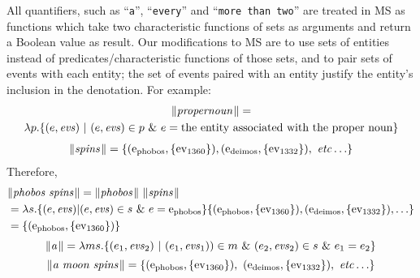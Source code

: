 \documentclass[../main.tex]{subfiles}
\begin{document}
\begin{refsection}
All quantifiers, such as ``\texttt{a}'', ``\texttt{every}'' and ``\texttt{more than two}'' are treated in MS as functions which take two characteristic functions of sets as arguments and return a Boolean value as result. Our modifications to MS are to use sets of entities instead of predicates/characteristic functions of those sets, and to pair sets of events with each entity; the set of events paired with an entity justify the entity’s inclusion in the denotation. For example:
\begin{multline*}
	\lVert\textit{propernoun\hspace{0.1em}}\rVert = \\ \lambda p.
	\{(e, \operatorname{\mathit{evs}})\ |\ (e, \operatorname{\mathit{evs}}) \in p\ \&\ e = \text{the entity associated with the proper noun}\}
\end{multline*}
\begin{equation*}
	\begin{split}
		\lVert\textit{spins\hspace{0.1em}}\rVert = \{(\mathrm{e}_{\operatorname{phobos}}, \{\operatorname{ev}_{1360}\}),
		(\mathrm{e}_{\operatorname{deimos}}, \{\operatorname{ev}_{1332}\}),\ \operatorname{\mathit{etc\ldots}}\}
	\end{split}
\end{equation*}
Therefore,
\begin{equation*}
	\begin{split}
		& \lVert\textit{phobos spins\hspace{0.1em}}\rVert = \lVert\textit{phobos\hspace{0.1em}}\rVert\ \lVert\textit{spins\hspace{0.1em}}\rVert \\
		& = \lambda s.\{(e, \operatorname{\mathit{evs}}) | (e, \operatorname{\mathit{evs}}) \in s\ \&\ e = \mathrm{e}_{\operatorname{phobos}}\}
		 \{(\mathrm{e}_{\operatorname{phobos}},\{\operatorname{ev}_{1360}\}), (\mathrm{e}_{\operatorname{deimos}}, \{\operatorname{ev}_{1332}\}), \ldots\} \\
		& = \{(\mathrm{e}_{\operatorname{phobos}}, \{\operatorname{ev}_{1360}\})\}
	\end{split}
\end{equation*}
\begin{equation*} %
	\meaningof{a} = \lambda ms.\{(e_1,\evs_2)\ |\ (e_1,\evs_1) )\in m\
	\&\ (e_2,\evs_2) \in s\ \&\ e_1 = e_2\}
\end{equation*}
\begin{equation*}
	\lVert\textit{a\ moon\ spins\hspace{0.1em}}\rVert =
	\{(\mathrm{e}_{\operatorname{phobos}}, \{\operatorname{ev}_{1360}\}),\ (\mathrm{e}_{\operatorname{deimos}}, \{\operatorname{ev}_{1332}\}),\ \operatorname{\mathit{etc\ldots}}\}
\end{equation*}




\end{refsection}
\end{document}
